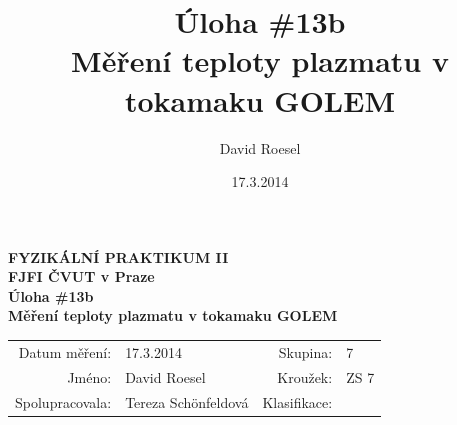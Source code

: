 \documentclass[english]{article}
\newcommand{\Author}{David Roesel}
\newcommand{\Coauthor}{Tereza Schönfeldová}
\newcommand{\Institute}{FJFI ČVUT v Praze}
\newcommand{\Subject}{FYZIKÁLNÍ PRAKTIKUM II}
\newcommand{\Group}{7}
\newcommand{\Circle}{ZS 7}
\newcommand{\Title}{Úloha \#13b  \\Měření teploty plazmatu v tokamaku GOLEM}
\newcommand{\Date}{17.3.2014}
\begin{document}
\author{\Author}
\title{\Title}
\date{\Date}

\renewcommand{\figurename}{Obr.}
\renewcommand{\tablename}{Tab.}
\renewcommand{\refname}{Reference}


\setlength{\parindent}{0cm}
\begin{multicols}{2}
\textbf{\Subject \\
        \Institute \\[0.1cm]
\Title \\[0.5cm]
}
\begin{tabular}{rlrl}
\large Datum měření: & \Date & \large Skupina: & \Group \\
\large Jméno: & \Author & \large Kroužek:  & \Circle\\
\large Spolupracovala: & \Coauthor &\large Klasifikace:\\
\end{tabular}


\end{multicols}
\end{document}
